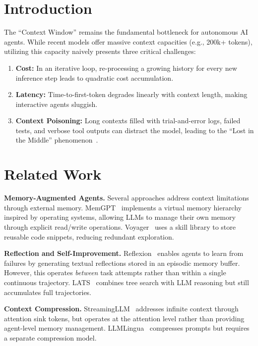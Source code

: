 \documentclass[conference]{IEEEtran}
\begin{document}
\section{Introduction}
The ``Context Window'' remains the fundamental bottleneck for autonomous AI agents. While recent models offer massive context capacities (e.g., 200k+ tokens), utilizing this capacity naively presents three critical challenges:
\begin{enumerate}
    \item \textbf{Cost:} In an iterative loop, re-processing a growing history for every new inference step leads to quadratic cost accumulation.
    \item \textbf{Latency:} Time-to-first-token degrades linearly with context length, making interactive agents sluggish.
    \item \textbf{Context Poisoning:} Long contexts filled with trial-and-error logs, failed tests, and verbose tool outputs can distract the model, leading to the ``Lost in the Middle'' phenomenon~\cite{liu2023lost}.
\end{enumerate}

\section{Related Work}

\textbf{Memory-Augmented Agents.} Several approaches address context limitations through external memory. MemGPT~\cite{packer2023memgpt} implements a virtual memory hierarchy inspired by operating systems, allowing LLMs to manage their own memory through explicit read/write operations. Voyager~\cite{wang2023voyager} uses a skill library to store reusable code snippets, reducing redundant exploration.

\textbf{Reflection and Self-Improvement.} Reflexion~\cite{shinn2023reflexion} enables agents to learn from failures by generating textual reflections stored in an episodic memory buffer. However, this operates \textit{between} task attempts rather than within a single continuous trajectory. LATS~\cite{zhou2023lats} combines tree search with LLM reasoning but still accumulates full trajectories.

\textbf{Context Compression.} StreamingLLM~\cite{xiao2023streamingllm} addresses infinite context through attention sink tokens, but operates at the attention level rather than providing agent-level memory management. LLMLingua~\cite{jiang2023llmlingua} compresses prompts but requires a separate compression model.
\end{document}
